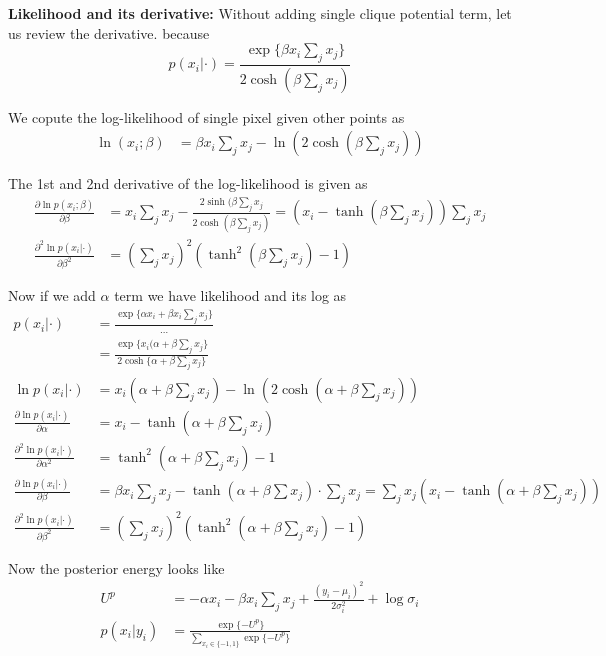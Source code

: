 \documentclass[12pt]{article}
\begin{document}
\textbf{Likelihood and its derivative: } Without adding single clique potential term, let us review the derivative. because 
\begin{equation*}
p(x_i | \cdot ) = \frac{ \exp\{ \beta x_i \sum_j x_j\}}{2\cosh (\beta \sum_j x_j)}
\end{equation*}

We copute the log-likelihood of single pixel given other points as
\begin{align*}
  \ln(x_i; \beta) &= \beta x_i \sum_j x_j - \ln \left(2\cosh(\beta \sum_j x_j)\right)
\end{align*}

The 1st and 2nd derivative of the log-likelihood is given as
\begin{align*}
  \frac{\partial \ln p(x_i; \beta)}{\partial \beta} &= x_i\sum_j x_j - \frac{2\sinh(\beta\sum_j x_j}{2\cosh(\beta\sum_j x_j)} = \left(x_i - \tanh(\beta \sum_j x_j)\right)\sum_j x_j \\
  \frac{\partial^2 \ln p(x_i | \cdot)}{\partial \beta^2} &= \left (\sum_j x_j \right )^2 \left (\tanh^2(\beta \sum_j x_j) - 1 \right )
\end{align*}

Now if we add $\alpha$ term we have likelihood and its log as
\begin{align*}
  p(x_i | \cdot) &= \frac{\exp\{ \alpha x_i + \beta x_i \sum_j x_j \}}{\dots} \\
  &= \frac{\exp\{ x_i(\alpha + \beta \sum_j x_j \}}{2\cosh \{ \alpha + \beta \sum_j x_j\}} \\
 \ln p(x_i | \cdot) &= x_i ( \alpha + \beta \sum_j x_j) - \ln \left (2\cosh(\alpha + \beta \sum_j x_j) \right ) \\
 \frac{\partial \ln p(x_i | \cdot)}{\partial \alpha} &= x_i - \tanh(\alpha + \beta \sum_j x_j) \\
\frac{\partial^2 \ln p(x_i | \cdot)}{\partial \alpha^2} &= \tanh^2 \left ( \alpha + \beta \sum_j x_j \right ) - 1 \\
\frac{\partial \ln p(x_i | \cdot)}{\partial \beta} &= \beta x_i \sum_j x_j - \tanh(\alpha + \beta \sum x_j) \cdot \sum_j x_j = \sum_j x_j \left ( x_i - \tanh(\alpha + \beta\sum_j x_j) \right)  \\
\frac{\partial^2 \ln p(x_i | \cdot)}{\partial \beta^2} &= \left ( \sum_j x_j\right )^2 \left ( \tanh^2 (\alpha + \beta \sum_j x_j) - 1\right )
\end{align*}

Now the posterior energy looks like
\begin{align*}
  U^p &= -\alpha x_i  -\beta x_i \sum_j x_j + \frac{(y_i - \mu_i)^2}{2\sigma_i^2} + \log \sigma_i \\
  p(x_i | y_i) &= \frac{\exp \{ -U^p\}}{\sum_{x_i\in \{-1, 1\}}\exp \{ -U^p\}} \\
\end{align*}
\end{document}
